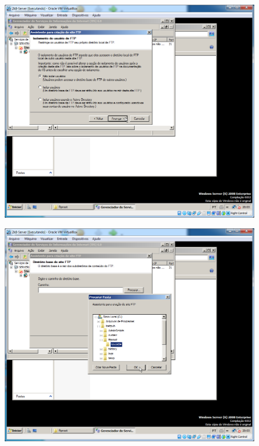 \documentclass[10pt]{article}
\begin{document}
\begin{figure}[H]
    \centering
    \caption{}
    \label{fig:54113}
    \includegraphics[width=\linewidth]{images/windows_server/ftp/021.png}
\end{figure}
\begin{figure}[H]
    \centering
    \caption{}
    \label{fig:54114}
    \includegraphics[width=\linewidth]{images/windows_server/ftp/023.png}
\end{figure}
\end{document}
